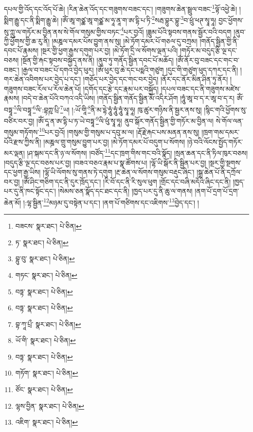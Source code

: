 དཔལ་གྱི་འོད་དང་འོད་པོ་ཆེ། །རིན་ཆེན་འོད་དང་གཟུགས་བཟང་དང་། །གཟུགས་ཆེན་སྦྲུལ་བཟང་\footnote{བཟངས་  སྣར་ཐང་།  པེ་ཅིན། }ལྟོ་འཕྱེ་ཆེ། །སྨིག་རྒྱུ་དང་ནི་སྨིག་རྒྱུ་ཆེ། །ཨོཾ་ཨཱ་གཙྪ་ཨཱ་གཙྪ་མ་ཧཱ་ནཱ་ག་ཨ་དྷི་པ་ཏི་\footnote{ཏ་  སྣར་ཐང་།  པེ་ཅིན། }སརྦ་བྷུར་བྷུ་\footnote{བྷུ་བུ་  སྣར་ཐང་།  པེ་ཅིན། }བ་ཕྲུཾ་ཕཊ་སྭཱ་ཧཱ། བྱང་ཕྱོགས་སུ་ཀླུ་ལ་གཏོར་མ་བྱིན་ནས་སེ་གོལ་གསུམ་གྱིས་བཏང་\footnote{གཏང་  སྣར་ཐང་།  པེ་ཅིན། }པར་བྱའོ། །ཟླུམ་པོའི་སྟབས་གནས་སྦྱོར་བའི་བདག །ནུབ་ཀྱི་ཕྱོགས་གྱི་ཆ་རུ་ནི། །མཎྜལ་དམར་པོས་བྱུག་ནས་སུ། །མེ་ཏོག་དམར་པོ་གཅལ་དུ་བཀྲམ། །གནོད་སྦྱིན་གྱི་ནི་དབང་པོ་རྣམས། །སྔར་གྱི་ཕྱག་རྒྱས་དགུག་པར་བྱ། །མེ་ཏོག་དྲི་ལ་སོགས་ལྡན་པའི། །གཏོར་མ་བདུད་རྩི་ལྔ་དང་བཅས། །སྔོན་གྱི་རྐང་སྟབས་བསྐྱོད་ནས་ནི། །ནུབ་ཏུ་གནོད་སྦྱིན་དབང་པོ་མཆོད། །ཨོཾ་ནོར་བུ་བཟང་དང་གང་བ་བཟང་། །རྒྱལ་བ་བཟང་པོ་དགའ་བྱེད་ཕུར། །ཨོཾ་ཕུར་བུ་ཆེ་དང་པདྨའི་གཙུག །དུང་གི་གཙུག་ཕུད་དཀར་དང་ནི། །གར་ཆེན་འབིགས་པར་བྱེད་པ་དང་། །གཅོད་པར་བྱེད་དང་གང་བར་བྱེད། །ནོར་དང་ནོར་མིན་ཤིན་ཏུ་ནོར། །གཟུགས་བཟང་རོལ་པ་རོལ་ཆེན་པོ། །དགོད་དང་རྩེ་དང་རྣམ་པར་བསྐྱོད། །དཔལ་བཟང་དང་ནི་གཟུགས་མཛེས་རྣམས། །བདེ་བ་ཆེན་པོའི་བཀའ་འདི་ཡིས། །གནོད་སྦྱིན་གནོད་སྦྱིན་མོ་འདིར་ཤོག །ཧཱུཾ་ཨཱ་བ་ད་ར་ཨཱ་བ་ད་ར། ཨོཾ་བཏྟཱ་\footnote{བཏྟ་  སྣར་ཐང་།  པེ་ཅིན། }ལི་བཏྟཱ་\footnote{བཏྟ་  སྣར་ཐང་།  པེ་ཅིན། }ལི་:བྷཀྵ་པྲི་\footnote{བྷ་ཀཱ་པྲྀ་  སྣར་ཐང་།  པེ་ཅིན། }ཡ། །:ཡོ་གཱི་\footnote{ཡོ་གི་  སྣར་ཐང་།  པེ་ཅིན། }ནི་མ་དྷེ་ཧཱུཾ་ཧཱུཾ་ཧཱུཾ་སྭཱ་ཧཱ། ཁུ་ཚུར་གཉིས་ནི་སྦྱར་ནས་སུ། །སྙིང་གའི་ཕྱོགས་སུ་བཙིར་བར་བྱ། །ཨོཾ་དཱ་ན་ཨ་དྷི་པ་ཏ་ཡེ་བཏྟཱ་\footnote{བཏྟ་  སྣར་ཐང་།  པེ་ཅིན། }ལི་ཕུཾ་སྭཱ་ཧཱ། ནུབ་སྒོར་གནོད་སྦྱིན་གྱི་གཏོར་མ་བྱིན་ལ། སེ་གོལ་ལན་གསུམ་གཏོགས་\footnote{གཏོག་  སྣར་ཐང་།  པེ་ཅིན། }པར་བྱའོ། །གསུམ་གྱི་གསུམ་པ་དབུ་མ་ལ། །རྡོ་རྗེ་རྐང་པས་མནན་ནས་སུ། །ཁྲག་གམ་དམར་པོའི་རྫས་ཀྱིས་ནི། །མཎྜལ་གྲུ་གསུམ་བྱུག་པར་བྱ། །མེ་ཏོག་དམར་པོ་བདུག་པ་སོགས། །ཉེ་བའི་ལོངས་སྤྱོད་གཏོར་མར་ལྡན། །ཤ་སྐམ་དང་ནི་ཉ་ལ་སོགས། །བཙོད་\footnote{ཙོང་  སྣར་ཐང་།  པེ་ཅིན། }དང་ཁྲག་གིས་གང་བའི་སྣོད། །སྲན་ཆན་དང་ནི་ཏིལ་ཁུར་བཅས། །བདུད་རྩི་ལྔ་དང་བཅས་པར་བྱ། །བཟའ་བཅའ་རྣམ་པ་སྣ་ཚོགས་པ། །ལྷོ་ཡི་སྒོར་ནི་སྦྱིན་པར་བྱ། །སྔར་གྱི་སྔགས་དང་ཕྱག་རྒྱ་ཡིས། །ལྷོ་ཡི་ལོགས་སུ་གནས་ཏེ་དགུག །རྔ་ཆེན་ལ་སོགས་གསུམ་བརྡུང་ཞིང་། །སྒྲ་ཆེན་པོ་ནི་དཀྲོལ་བར་བྱ། །ཨོཾ་ཤིང་གཅིག་དང་ནི་དུར་ཁྲོད་དང་། །རི་བོ་དང་ནི་རི་སུལ་ཕུག །གྲོང་དང་བཞི་མདོའི་ཞིང་དང་ནི། །ཁྱད་པར་དུ་ནི་ཁང་སྟོང་དང་། །སེམས་ཅན་སྣོད་དང་ཐང་དང་ནི། །ཁྱད་པར་དུ་ནི་ཆུ་ལ་གནས། །ནག་པོ་དྲག་པོ་དྲག་ཆེན་མོ། །:ལྷ་སྦྱིན་\footnote{ལྷས་བྱིན་  སྣར་ཐང་།  པེ་ཅིན། }མཉམ་དུ་བསྟེན་པ་དང་། །ནག་པོ་གཙིགས་དང་འཇིགས་\footnote{འཇིག་  སྣར་ཐང་།  པེ་ཅིན། }བྱེད་དང་། །
